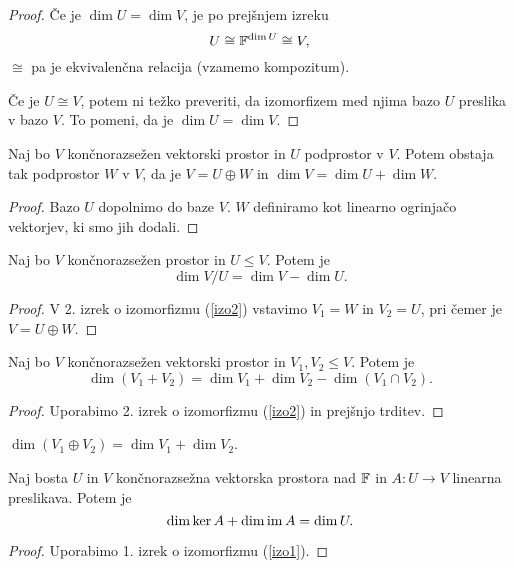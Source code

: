 \documentclass[12pt, a4paper]{article}
\begin{document}
\begin{proof}
Če je $\dim U=\dim V$, je po prejšnjem izreku
\[
U\cong \mathbb{F}^{\dim U}\cong V,
\]
$\cong$ pa je ekvivalenčna relacija (vzamemo kompozitum).

Če je $U\cong V$, potem ni težko preveriti, da izomorfizem med njima bazo $U$ preslika v bazo $V$. To pomeni, da je $\dim U=\dim V$.
\end{proof}

\begin{trditev}
Naj bo $V$ končnorazsežen vektorski prostor in $U$ podprostor v $V$. Potem obstaja tak podprostor $W$ v $V$, da je $V=U\oplus W$ in $\dim V=\dim U+\dim W$.
\end{trditev}

\begin{proof}
Bazo $U$ dopolnimo do baze $V$. $W$ definiramo kot linearno ogrinjačo vektorjev, ki smo jih dodali.
\end{proof}

\begin{trditev}
Naj bo $V$ končnorazsežen prostor in $U\leq V$. Potem je
\[
\dim V/U=\dim V-\dim U.
\]
\end{trditev}

\begin{proof}
V 2. izrek o izomorfizmu (\ref{izo2}) vstavimo $V_1=W$ in $V_2=U$, pri čemer je $V=U\oplus W$.
\end{proof}

\begin{trditev}
Naj bo $V$ končnorazsežen vektorski prostor in $V_1,V_2\leq V$. Potem je
\[
\dim(V_1+V_2)=\dim V_1+\dim V_2-\dim(V_1\cap V_2).
\]
\end{trditev}

\begin{proof}
Uporabimo 2. izrek o izomorfizmu (\ref{izo2}) in prejšnjo trditev.
\end{proof}

\begin{posledica}
$\dim(V_1\oplus V_2)=\dim V_1+\dim V_2$.
\end{posledica}

\begin{trditev}
Naj bosta $U$ in $V$ končnorazsežna vektorska prostora nad $\mathbb{F}$ in $A\colon U\to V$ linearna preslikava. Potem je
\[
\dim\ker A+\dim\operatorname{im} A=\dim U.
\]
\end{trditev}

\begin{proof}
Uporabimo 1. izrek o izomorfizmu (\ref{izo1}).
\end{proof}
\end{document}
